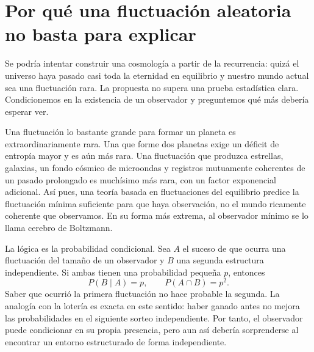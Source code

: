 \begin{classroomqa}\end{classroomqa}

\section{Por qué una fluctuación aleatoria no basta para explicar}

Se podría intentar construir una cosmología a partir de la recurrencia: quizá el universo haya pasado casi toda la eternidad en equilibrio y nuestro mundo actual sea una fluctuación rara. La propuesta no supera una prueba estadística clara. Condicionemos en la existencia de un observador y preguntemos qué más debería esperar ver.

Una fluctuación lo bastante grande para formar un planeta es extraordinariamente rara. Una que forme dos planetas exige un déficit de entropía mayor y es aún más rara. Una fluctuación que produzca estrellas, galaxias, un fondo cósmico de microondas y registros mutuamente coherentes de un pasado prolongado es muchísimo más rara, con un factor exponencial adicional. Así pues, una teoría basada en fluctuaciones del equilibrio predice la fluctuación mínima suficiente para que haya observación, no el mundo ricamente coherente que observamos. En su forma más extrema, al observador mínimo se lo llama cerebro de Boltzmann.

La lógica es la probabilidad condicional. Sea \(A\) el suceso de que ocurra una fluctuación del tamaño de un observador y \(B\) una segunda estructura independiente. Si ambas tienen una probabilidad pequeña \(p\), entonces
\begin{equation}
 P(B\mid A)=p,
 \qquad
 P(A\cap B)=p^2.
 \label{eq:sm8-conditional-fluctuations}
\end{equation}
Saber que ocurrió la primera fluctuación no hace probable la segunda. La analogía con la lotería es exacta en este sentido: haber ganado antes no mejora las probabilidades en el siguiente sorteo independiente. Por tanto, el observador puede condicionar en su propia presencia, pero aun así debería sorprenderse al encontrar un entorno estructurado de forma independiente.

